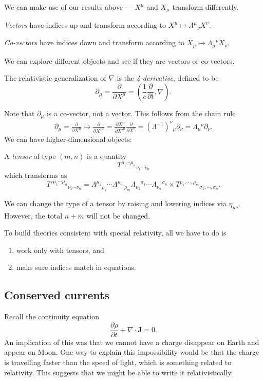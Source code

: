 \documentclass[a4paper]{article}
\begin{document}
We can make use of our results above --- $X^\mu$ and $X_\mu$ transform differently.

\begin{defi}
  \emph{Vectors} have indices up and transform according to $X^\mu \mapsto \Lambda^\mu\!_\nu X^\nu$.

  \emph{Co-vectors} have indices down and transform according to $X_\mu \mapsto \Lambda_\mu\!^\nu X_\nu$.
\end{defi}

We can explore different objects and see if they are vectors or co-vectors.
\begin{defi}[4-derivative]
  The relativistic generalization of $\nabla$ is the \emph{4-derivative}, defined to be
  \[
    \partial_\mu = \frac{\partial}{\partial X^\mu} = \left(\frac{1}{c}\frac{\partial}{\partial t}, \nabla\right).
  \]
\end{defi}
Note that $\partial_\mu$ is a co-vector, not a vector. This follows from the chain rule
\begin{align*}
  \partial_\mu = \frac{\partial}{\partial X^\mu} \mapsto \frac{\partial}{\partial X'^\mu} = \frac{\partial X^\nu}{\partial X'^\mu}\frac{\partial}{\partial X^\nu} = (\Lambda^{-1})^\nu\!_\mu\partial_\nu = \Lambda_\mu\!^\nu \partial_\nu.
\end{align*}
We can have higher-dimensional objects:
\begin{defi}[Tensor]
  A \emph{tensor} of type $(m, n)$ is a quantity
  \[
    T^{\mu_1\cdots \mu_n}\!_{\nu_1\cdots \nu_n}
  \]
  which transforms as
  \[
    T'^{\mu_1\cdots \mu_n}\!_{\nu_1\cdots \nu_n} = \Lambda^{\mu_1}\!_{\rho_1} \cdots \Lambda^{\mu_m}\!_{\rho_m}\Lambda_{\nu_1}\!^{\sigma_1}\cdots\Lambda_{\nu_n}\!^{\sigma_n} \times T^{\rho_1, \cdots, \rho_m}\!_{\sigma_1, \cdots, \sigma_n}.
  \]
\end{defi}
We can change the type of a tensor by raising and lowering indices via $\eta_{\mu\nu}$. However, the total $n + m$ will not be changed.

To build theories consistent with special relativity, all we have to do is
\begin{enumerate}
  \item work only with tensors, and
  \item make sure indices match in equations.
\end{enumerate}

\subsection{Conserved currents}
Recall the continuity equation
\[
  \frac{\partial\rho}{\partial t} + \nabla\cdot \mathbf{J} = 0.
\]
An implication of this was that we cannot have a charge disappear on Earth and appear on Moon. One way to explain this impossibility would be that the charge is travelling faster than the speed of light, which is something related to relativity. This suggests that we might be able to write it relativistically.
\end{document}
